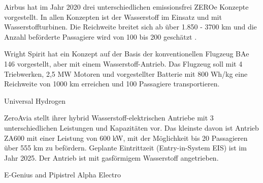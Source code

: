 Airbus hat im Jahr 2020 drei unterschiedlichen emissionsfrei ZEROe Konzepte vorgestellt. 
In allen Konzepten ist der Wasserstoff im Einsatz und mit Wasserstoffturbinen. Die Reichweite breitet sich ab über 1.850 - 
3700 km und die Anzahl beförderte Passagiere wird von 100 bis 200 geschätzt \cite{airbus_zea_concepts}.

Wright Spirit \cite{wright_electric_website} hat ein Konzept auf der Basis der konventionellen Flugzeug BAe 146 vorgestellt, aber mit einem Wasserstoff-Antrieb.
Das Flugzeug soll mit 4 Triebwerken, 2,5 MW Motoren und vorgestellter Batterie mit 800 Wh/kg eine Reichweite von 1000 
km erreichen und 100 Passagiere transportieren.


Universal Hydrogen

ZeroAvia stellt ihrer hybrid Wasserstoff-elektrischen Antriebe mit 3 unterschiedlichen Leistungen und Kapazitäten vor. Das kleinste davon
ist Antrieb ZA600 mit einer Leistung von 600 kW, mit der Möglichkeit bis 20 Passagieren über 555 km zu befördern. 
Geplante Eintrittzeit (Entry-in-System EIS) ist im Jahr 2025. Der Antrieb ist mit gasförmigem Wasserstoff angetrieben.

E-Genius and 
Pipistrel Alpha Electro

